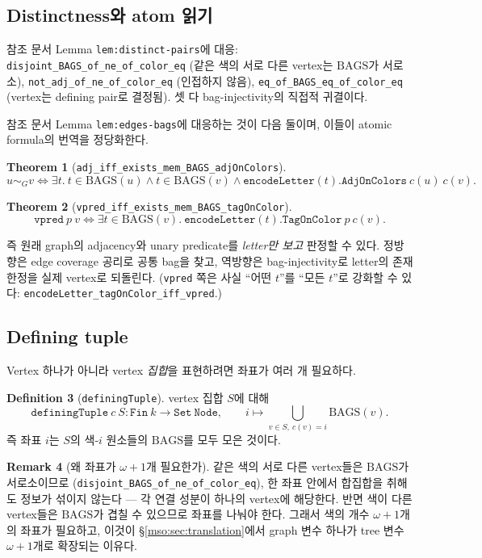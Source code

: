 \documentclass[11pt]{article}
\theoremstyle{definition}
\newtheorem{definition}{Definition}[section]
\newtheorem{remark}[definition]{Remark}
\theoremstyle{plain}
\newtheorem{theorem}[definition]{Theorem}
\newcommand{\lean}[1]{\texttt{#1}}
\newcommand{\BAGS}{\mathrm{BAGS}}
\begin{document}
\subsection{Distinctness와 atom 읽기}

참조 문서 Lemma \lean{lem:distinct-pairs}에 대응:
\lean{disjoint\_BAGS\_of\_ne\_of\_color\_eq} (같은 색의 서로 다른 vertex는
$\BAGS$가 서로소), \lean{not\_adj\_of\_ne\_of\_color\_eq} (인접하지 않음),
\lean{eq\_of\_BAGS\_eq\_of\_color\_eq} (vertex는 defining pair로 결정됨).
셋 다 bag-injectivity의 직접적 귀결이다.

참조 문서 Lemma \lean{lem:edges-bags}에 대응하는 것이 다음 둘이며, 이들이
atomic formula의 번역을 정당화한다.

\begin{theorem}[\lean{adj\_iff\_exists\_mem\_BAGS\_adjOnColors}]
\label{mso:thm:adjfrombags}
\[
  u \sim_G v \iff \exists t.\ t \in \BAGS(u) \land t \in \BAGS(v) \land
    \lean{encodeLetter}(t).\lean{AdjOnColors}\ c(u)\ c(v).
\]
\end{theorem}

\begin{theorem}[\lean{vpred\_iff\_exists\_mem\_BAGS\_tagOnColor}]
\label{mso:thm:predfrombags}
\[
  \lean{vpred}\ p\ v \iff \exists t \in \BAGS(v).\
    \lean{encodeLetter}(t).\lean{TagOnColor}\ p\ c(v).
\]
\end{theorem}

즉 원래 graph의 adjacency와 unary predicate를 \emph{letter만 보고} 판정할 수
있다. 정방향은 edge coverage 공리로 공통 bag을 찾고, 역방향은
bag-injectivity로 letter의 존재 한정을 실제 vertex로 되돌린다.
(\lean{vpred} 쪽은 사실 ``어떤 $t$''를 ``모든 $t$''로 강화할 수 있다:
\lean{encodeLetter\_tagOnColor\_iff\_vpred}.)

\subsection{Defining tuple}

Vertex 하나가 아니라 vertex \emph{집합}을 표현하려면 좌표가 여러 개 필요하다.

\begin{definition}[\lean{definingTuple}]
\label{mso:def:definingtuple}
vertex 집합 $S$에 대해
\[
  \lean{definingTuple}\ c\ S : \lean{Fin}\ k \to \lean{Set}\ \lean{Node},
  \qquad
  i \mapsto \bigcup_{v \in S,\ c(v) = i} \BAGS(v).
\]
즉 좌표 $i$는 $S$의 색-$i$ 원소들의 $\BAGS$를 모두 모은 것이다.
\end{definition}

\begin{remark}[왜 좌표가 $\omega+1$개 필요한가]
같은 색의 서로 다른 vertex들은 $\BAGS$가 서로소이므로
(\lean{disjoint\_BAGS\_of\_ne\_of\_color\_eq}), 한 좌표 안에서 합집합을 취해도
정보가 섞이지 않는다 --- 각 연결 성분이 하나의 vertex에 해당한다. 반면 색이
다른 vertex들은 $\BAGS$가 겹칠 수 있으므로 좌표를 나눠야 한다. 그래서 색의
개수 $\omega+1$개의 좌표가 필요하고, 이것이 \S\ref{mso:sec:translation}에서
graph 변수 하나가 tree 변수 $\omega+1$개로 확장되는 이유다.
\end{remark}
\end{document}
